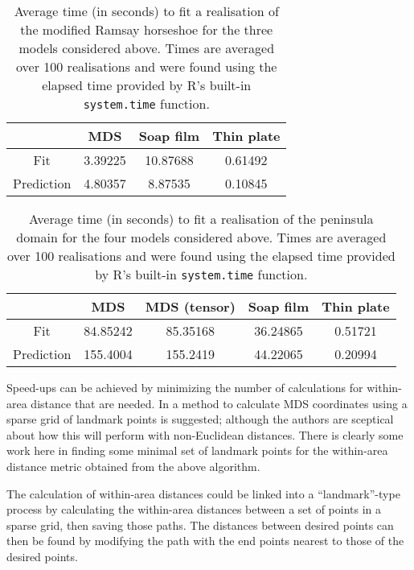 \documentclass[a4paper,10pt]{article}
\begin{document}
\begin{table}[ht]
\centering
\begin{tabular}{c || c c c}
 & MDS & Soap film & Thin plate\\ 
\hline
Fit & 3.39225 & 10.87688 & 0.61492\\
Prediction & 4.80357 & 8.87535 & 0.10845\\
\end{tabular}
\label{ramsaytime}
\caption{Average time (in seconds) to fit a realisation of the modified Ramsay horseshoe for the three models considered above. Times are averaged over 100 realisations and were found using the elapsed time provided by \textsf{R}'s built-in \texttt{system.time} function.}
\end{table}


\begin{table}[ht]
\centering
\begin{tabular}{c || c c c c}
 & MDS & MDS (tensor) & Soap film & Thin plate\\ 
\hline
Fit & 84.85242 & 85.35168 & 36.24865 & 0.51721\\
Prediction & 155.4004 & 155.2419 & 44.22065 & 0.20994 \\
\end{tabular}
\label{wt2time}
\caption{Average time (in seconds) to fit a realisation of the peninsula domain for the four models considered above. Times are averaged over 100 realisations and were found using the elapsed time provided by \textsf{R}'s built-in \texttt{system.time} function.}
\end{table}


Speed-ups can be achieved by minimizing the number of calculations for within-area distance that are needed. In \cite{landmark} a method to calculate MDS coordinates using a sparse grid of landmark points is suggested; although the authors are sceptical about how this will perform with non-Euclidean distances. There is clearly some work here in finding some minimal set of landmark points for the within-area distance metric obtained from the above algorithm.

The calculation of within-area distances could be linked into a ``landmark''-type process by calculating the within-area distances between a set of points in a sparse grid, then saving those paths. The distances between desired points can then be found by modifying the path with the end points nearest to those of the desired points.




\end{document}
